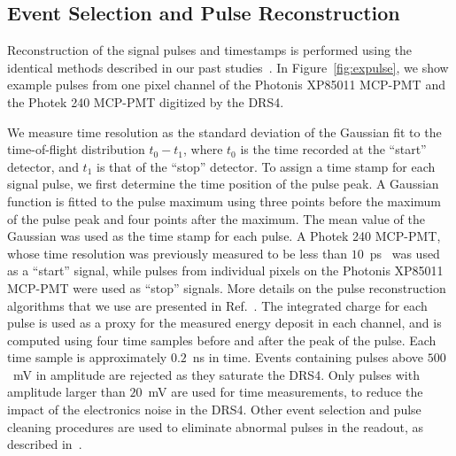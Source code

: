 

\subsection{Event Selection and Pulse Reconstruction}\label{sec:reconstruction}
Reconstruction of the signal pulses and timestamps is performed using the
identical methods described in our past
studies~\cite{Anderson:2015gha,MCPFastCaloNIMA,Ronzhin:2015pba}.
In Figure~\ref{fig:expulse}, we show example pulses from one pixel channel of
the Photonis XP85011 MCP-PMT and the Photek 240 MCP-PMT digitized by the DRS4.

We measure time resolution as the standard deviation of the Gaussian fit to the
time-of-flight distribution $t_0-t_1$, where $t_0$ is the time recorded at the
``start'' detector, and $t_1$ is that of the ``stop'' detector. To assign a time
stamp for each signal pulse, we first determine the time position of the pulse
peak. A Gaussian function is fitted to the pulse maximum using three points
before the maximum of the pulse peak and four points after the maximum. The mean
value of the Gaussian was used as the time stamp for each pulse. A Photek 240
MCP-PMT, whose time resolution was previously measured to be less than
$10$~ps~\cite{Ronzhin:2015pba} was used as a ``start'' signal, while pulses from
individual pixels on the Photonis XP85011 MCP-PMT were used as ``stop'' signals.
More details on the pulse reconstruction algorithms that we use are presented in
Ref.~\cite{MCPFastCaloNIMA}. The integrated charge for each pulse is used as a
proxy for the measured energy deposit in each channel, and is computed using
four time samples before and after the peak of the pulse. Each time sample is
approximately $0.2$~ns in time. Events containing pulses above $500$~mV in
amplitude are rejected as they saturate the DRS4. Only pulses with amplitude
larger than $20$~mV are used for time measurements, to reduce the impact of the
electronics noise in the DRS4. Other event selection and pulse cleaning
procedures are used to eliminate abnormal pulses in the readout, as described
in~\cite{MCPFastCaloNIMA}. 

